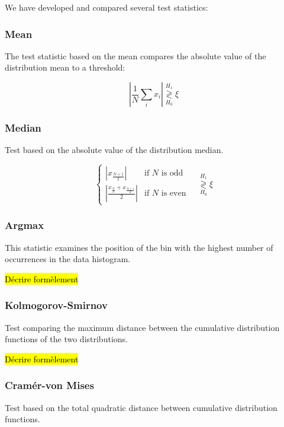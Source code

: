 \documentclass{article}
\begin{document}
We have developed and compared several test statistics:

\subsubsection{Mean}

The test statistic based on the mean compares the absolute value of the distribution mean to a threshold:

\begin{equation}
    \left|\frac{1}{N}\sum_i x_i \right| \stackrel{H_1}{\underset{H_0}{\gtrless}} \xi
\end{equation}

\subsubsection{Median}
Test based on the absolute value of the distribution median.

\begin{equation}
\begin{cases}
\left| x_{\frac{N+1}{2}} \right| & \text{if }N\text{ is odd} \\
\left| \frac{x_{\frac{N}{2}} + x_{\frac{N+1}{2}}}{2} \right|  & \text{if }N\text{ is even}
\end{cases}
\quad\stackrel{H_1}{\underset{H_0}{\gtrless}} \xi
\end{equation}

\subsubsection{Argmax}
This statistic examines the position of the bin with the highest number of occurrences in the data histogram.

\hl{Décrire formèlement}

\subsubsection{Kolmogorov-Smirnov}
Test comparing the maximum distance between the cumulative distribution functions of the two distributions.

\hl{Décrire formèlement}

\subsubsection{Cramér-von Mises}
Test based on the total quadratic distance between cumulative distribution functions.
\end{document}
